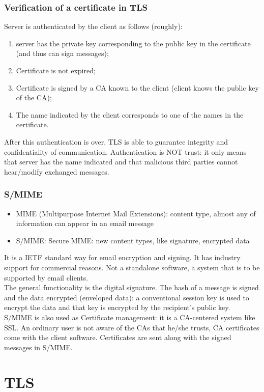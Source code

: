 \documentclass[a4paper, 10pt, titlepage]{article}
\begin{document}
\subsubsection{Verification of a certificate in TLS}
\label{section:tls2}
Server is authenticated by the client as follows (roughly): 
\begin{enumerate}
\item server has the private key corresponding to the public key in the certificate (and thus can sign messages);
\item Certificate is not expired;
\item Certificate is signed by a CA known to the client (client knows the public key of the CA);
\item The name indicated by the client corresponds to one of the names in the certificate.
\end{enumerate}
After this authentication is over, TLS is able to guarantee integrity and confidentiality of communication. Authentication is NOT trust: it only means that server has the name indicated and that malicious third parties cannot hear/modify exchanged messages.
\subsubsection{S/MIME}
\begin{itemize}
\item MIME (Multipurpose Internet Mail Extensions): content type, almost any of information can appear in an email message
\item S/MIME: Secure MIME: new content types, like signature, encrypted data
\end{itemize}
It is a IETF standard way for email encryption and signing. It has industry support for commercial reasons. Not a standalone software, a system that is to be supported by email clients. \\
The general functionality is the digital signature. The hash of a message is signed and the data encrypted (enveloped data): a conventional session key is used to encrypt the data and that key is encrypted by the recipient’s public key.\\
S/MIME is also used as Certificate management: it is a CA-centered system like SSL. An ordinary user is not aware of the CAs that he/she trusts, CA certificates come with the client software. Certificates are sent along with the signed messages in S/MIME.

\newpage
\section{TLS}
\end{document}
